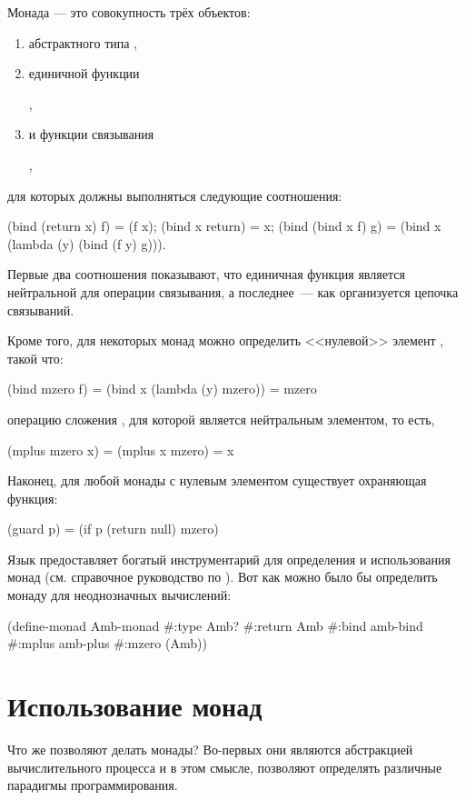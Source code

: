 Монада --- это совокупность трёх объектов:
\begin{enumerate}
  \item абстрактного типа ,
  \item единичной функции 
  \begin{center}
  ,
  \end{center}
  \item и функции связывания 
  \begin{center}
  ,
  \end{center}
\end{enumerate}
для которых должны выполняться следующие соотношения:
\begin{SchemeCode}[emph={f,x,y,g}]
  (bind (return x) f) = (f x);
  (bind x return) = x;
  (bind (bind x f) g) = (bind x (lambda (y) (bind (f y) g))).
\end{SchemeCode}
Первые два соотношения показывают, что единичная функция является нейтральной для операции связывания, а последнее~--- как организуется цепочка связываний.

Кроме того, для некоторых монад можно определить <<нулевой>> элемент , такой что:

\begin{SchemeCode}[emph={f,x,y}]
  (bind mzero f) = (bind x (lambda (y) mzero)) = mzero
\end{SchemeCode}
 операцию сложения , для которой  является нейтральным элементом, то есть,
\begin{SchemeCode}
  (mplus mzero x) = (mplus x mzero) = x
\end{SchemeCode}

Наконец, для любой монады с нулевым элементом существует охраняющая функция:

\begin{SchemeCode}[emph={p}]
  (guard p) = (if p (return null) mzero)
\end{SchemeCode}

Язык \Scheme предоставляет богатый инструментарий для определения и использования монад (см. справочное руководство по \Scheme). Вот как можно было бы определить монаду для неоднозначных вычислений:
\begin{SchemeCode}
(define-monad Amb-monad
  #:type Amb?
  #:return Amb
  #:bind amb-bind
  #:mplus amb-plus
  #:mzero (Amb))
\end{SchemeCode}

\section[2]{Использование монад}%
Что же позволяют делать монады? Во-первых они являются абстракцией вычислительного процесса и в этом смысле, позволяют определять различные парадигмы программирования. 

